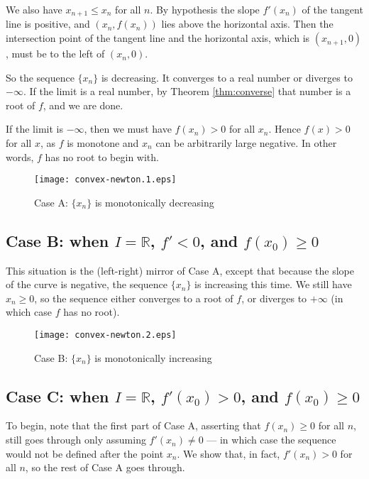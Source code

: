 \documentclass[12pt]{article}
\newcommand{\real}{\mathbb{R}}
\begin{document}
We also have $x_{n+1} \leq x_n$ for all $n$.
By hypothesis the slope $f'(x_n)$ of the tangent line is positive, 
and $(x_n, f(x_n))$ lies above the horizontal axis.
Then the intersection point of the tangent line and the horizontal axis,
which is $(x_{n+1}, 0)$, must be to the left of $(x_n, 0)$.

So the sequence $\{ x_n \}$ is decreasing.  It converges to a real number or
diverges to $-\infty$.  
If the limit is a real number, by Theorem \ref{thm:converse} that number
is a root of $f$, and we are done.

If the limit is $-\infty$, then we must have $f(x_n) > 0$
for all $x_n$. Hence $f(x) > 0$ for all $x$, as $f$ is monotone
and $x_n$ can be arbitrarily large negative.
In other words, $f$ has no root to begin with.

\begin{figure}[!htb]
\begin{center}
\texttt{[image: convex-newton.1.eps]}
\end{center}
\caption{Case A: $\{ x_n \}$ is monotonically decreasing}
\end{figure}

\subsection*{Case B: when $I = \real$, $f' < 0$, and $f(x_0) \geq 0$}
This situation is the (left-right) mirror of Case A, 
except that because the slope of the curve is negative,
the sequence $\{ x_n \}$ is increasing this time.  We still have $x_n \geq 0$,
so the sequence either converges to a root of $f$, or diverges to $+\infty$ (in which case $f$ has no root). 

\begin{figure}[!htb]
\begin{center}
\texttt{[image: convex-newton.2.eps]}
\end{center}
\caption{Case B: $\{ x_n \}$ is monotonically increasing}
\end{figure}

\subsection*{Case C: when $I = \real$, $f'(x_0) > 0$, and $f(x_0) \geq 0$}
To begin, note that the first part of Case A, asserting that $f(x_n) \geq 0$
for all $n$, still goes through only assuming $f'(x_n) \neq 0$
--- in which case the sequence would not be defined after the point $x_n$.
We show that, in fact, $f'(x_n) > 0$ for all $n$,
so the rest of Case A goes through. 
\end{document}
